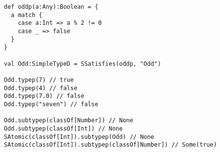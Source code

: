 \begin{lstlisting}[style=scalaioScala]
def oddp(a:Any):Boolean = {
  a match {
    case a:Int => a % 2 != 0
    case _ => false
  }
}

val Odd:SimpleTypeD = SSatisfies(oddp, "Odd")

Odd.typep(7) // true
Odd.typep(4) // false
Odd.typep(7.0) // false
Odd.typep("seven") // false

Odd.subtypep(classOf[Number]) // None
Odd.subtypep(classOf[Int]) // None
SAtomic(classOf[Int]).subtypep(Odd) // None
SAtomic(classOf[Int]).subtypep(classOf[Number]) // Some(true)
\end{lstlisting}
